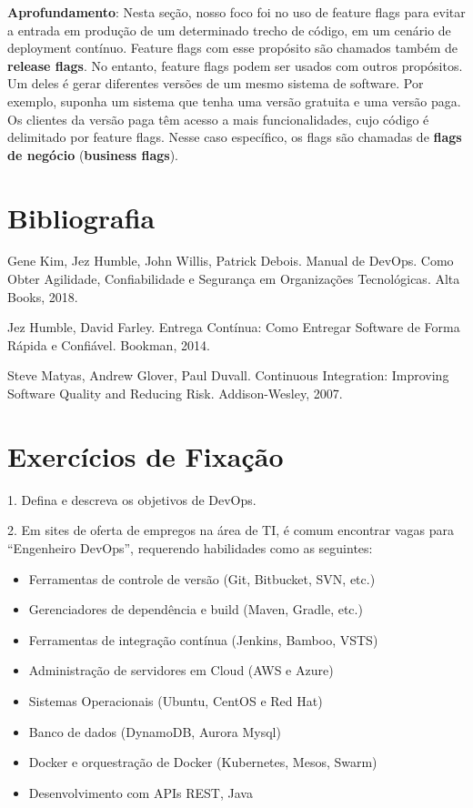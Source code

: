 \documentclass[
  11pt,
  twoside]{book}
\providecommand{\tightlist}{%
  \setlength{\itemsep}{0pt}\setlength{\parskip}{0pt}}
\newenvironment{esmbox}{\centering \vspace{1.5ex} \begin{tcolorbox}[breakable, colback=backcolor, width=4.9in]}{\end{tcolorbox} \vspace{1.5ex}}
\begin{document}
\begin{esmbox}

\textbf{Aprofundamento}: Nesta seção, nosso foco foi no uso de feature
flags para evitar a entrada em produção de um determinado trecho de
código, em um cenário de deployment contínuo. Feature flags com esse
propósito são chamados também de \textbf{release flags}. No entanto,
feature flags podem ser usados com outros propósitos. Um deles é gerar
diferentes versões de um mesmo sistema de software. Por exemplo, suponha
um sistema que tenha uma versão gratuita e uma versão paga. Os clientes
da versão paga têm acesso a mais funcionalidades, cujo código é
delimitado por feature flags. Nesse caso específico, os flags são
chamadas de \textbf{flags de negócio} (\textbf{business flags}).

\end{esmbox}

\hypertarget{bibliografia-9}{%
\section*{Bibliografia}\label{bibliografia-9}}

Gene Kim, Jez Humble, John Willis, Patrick Debois. Manual de DevOps.
Como Obter Agilidade, Confiabilidade e Segurança em Organizações
Tecnológicas. Alta Books, 2018.

Jez Humble, David Farley. Entrega Contínua: Como Entregar Software de
Forma Rápida e Confiável. Bookman, 2014.

Steve Matyas, Andrew Glover, Paul Duvall. Continuous Integration:
Improving Software Quality and Reducing Risk. Addison-Wesley, 2007.

\hypertarget{exercuxedcios-de-fixauxe7uxe3o-9}{%
\section*{Exercícios de
Fixação}\label{exercuxedcios-de-fixauxe7uxe3o-9}}

1. Defina e descreva os objetivos de DevOps.

2. Em sites de oferta de empregos na área de TI, é comum encontrar vagas
para ``Engenheiro DevOps'', requerendo habilidades como as seguintes:

\begin{itemize}
\tightlist
\item
  Ferramentas de controle de versão (Git, Bitbucket, SVN, etc.)
\item
  Gerenciadores de dependência e build (Maven, Gradle, etc.)
\item
  Ferramentas de integração contínua (Jenkins, Bamboo, VSTS)
\item
  Administração de servidores em Cloud (AWS e Azure)
\item
  Sistemas Operacionais (Ubuntu, CentOS e Red Hat)
\item
  Banco de dados (DynamoDB, Aurora Mysql)
\item
  Docker e orquestração de Docker (Kubernetes, Mesos, Swarm)
\item
  Desenvolvimento com APIs REST, Java
\end{itemize}
\end{document}
